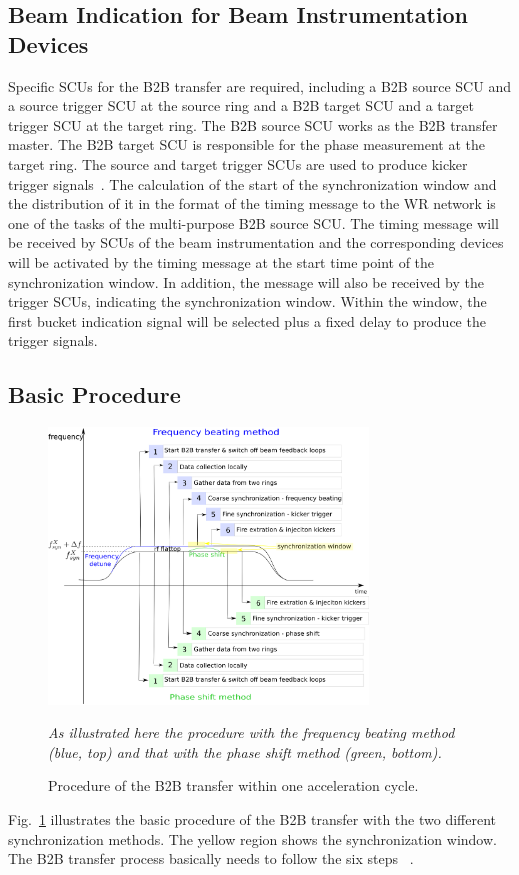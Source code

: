 \subsection{Beam Indication for Beam Instrumentation Devices}
\label{beam_indi}
Specific SCUs for the B2B transfer are required, including a B2B source SCU and a source trigger SCU at the source ring and a B2B target SCU and a target trigger SCU at the target ring. The B2B source SCU works as the B2B transfer master. The B2B target SCU is responsible for the phase measurement at the target ring. The source and target trigger SCUs are used to produce kicker trigger signals~\cite{bai_f-tc-c-05_2016}. The calculation of the start of the synchronization window and the distribution of it in the format of the timing message to the WR network is one of the tasks of the multi-purpose B2B source SCU. The timing message will be received by SCUs of the beam instrumentation and the corresponding devices will be activated by the timing message at the start time point of the synchronization window. In addition, the message will also be received by the trigger SCUs, indicating the synchronization window. Within the window, the first bucket indication signal will be selected plus a fixed delay to produce the trigger signals.
\subsection{Basic Procedure}
\begin{figure}[!htb]
   \centering   
   \includegraphics*[width=85mm]{procedure.eps}
   \caption{Procedure of the B2B transfer within one acceleration cycle.}
	{\textsl{\small{As illustrated here the procedure with the frequency beating method (blue, top) and that with the phase shift method (green, bottom).}}}
   \label{procedure}
\end{figure}

Fig.~\ref{procedure} illustrates the basic procedure of the B2B transfer with the two different synchronization methods. The yellow region shows the synchronization window. The B2B transfer process basically needs to follow the six steps ~\cite{bai_f-tc-c-05_2016}.

